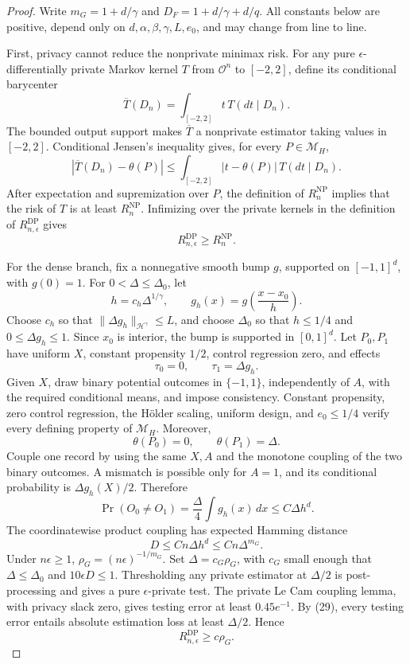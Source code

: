 \documentclass{article}
\begin{document}
\begin{proof}
Write \(m_G=1+d/\gamma\) and \(D_F=1+d/\gamma+d/q\).  All constants below are positive, depend only on \(d,\alpha,\beta,\gamma,L,e_0\), and may change from line to line.

First, privacy cannot reduce the nonprivate minimax risk.  For any pure \(\epsilon\)-differentially private Markov kernel \(T\) from \(\mathcal O^n\) to \([-2,2]\), define its conditional barycenter
\[
 \overline T(D_n)=\int_{[-2,2]}t\,T(dt\mid D_n).
\]
The bounded output support makes \(\overline T\) a nonprivate estimator taking values in \([-2,2]\).  Conditional Jensen's inequality gives, for every \(P\in\mathcal M_H\),
\[
 |\overline T(D_n)-\theta(P)|
 \le\int_{[-2,2]}|t-\theta(P)|\,T(dt\mid D_n).
\]
After expectation and supremization over \(P\), the definition of \(R_n^{\mathrm{NP}}\) implies that the risk of \(T\) is at least \(R_n^{\mathrm{NP}}\).  Infimizing over the private kernels in the definition of \(R_{n,\epsilon}^{\mathrm{DP}}\) gives
\[
 R_{n,\epsilon}^{\mathrm{DP}}\ge R_n^{\mathrm{NP}}.
 \tag{28}
\]

For the dense branch, fix a nonnegative smooth bump \(g\), supported on \([-1,1]^d\), with \(g(0)=1\).  For \(0<\Delta\le\Delta_0\), let
\[
 h=c_h\Delta^{1/\gamma},\qquad
 g_h(x)=g\!\left(\frac{x-x_0}{h}\right).
\]
Choose \(c_h\) so that \(\|\Delta g_h\|_{\mathcal H^\gamma}\le L\), and choose \(\Delta_0\) so that \(h\le1/4\) and \(0\le\Delta g_h\le1\).  Since \(x_0\) is interior, the bump is supported in \([0,1]^d\).  Let \(P_0,P_1\) have uniform \(X\), constant propensity \(1/2\), control regression zero, and effects
\[
 \tau_0=0,\qquad \tau_1=\Delta g_h.
\]
Given \(X\), draw binary potential outcomes in \(\{-1,1\}\), independently of \(A\), with the required conditional means, and impose consistency.  Constant propensity, zero control regression, the H\"older scaling, uniform design, and \(e_0\le1/4\) verify every defining property of \(\mathcal M_H\).  Moreover,
\[
 \theta(P_0)=0,\qquad \theta(P_1)=\Delta.
 \tag{29}
\]
Couple one record by using the same \(X,A\) and the monotone coupling of the two binary outcomes.  A mismatch is possible only for \(A=1\), and its conditional probability is \(\Delta g_h(X)/2\).  Therefore
\[
 \Pr(O_0\ne O_1)
 =\frac{\Delta}{4}\int g_h(x)\,dx
 \le C\Delta h^d.
\]
The coordinatewise product coupling has expected Hamming distance
\[
 D\le Cn\Delta h^d\le Cn\Delta^{m_G}.
 \tag{30}
\]
Under \(n\epsilon\ge1\), \(\rho_G=(n\epsilon)^{-1/m_G}\).  Set \(\Delta=c_G\rho_G\), with \(c_G\) small enough that \(\Delta\le\Delta_0\) and \(10\epsilon D\le1\).  Thresholding any private estimator at \(\Delta/2\) is post-processing and gives a pure \(\epsilon\)-private test.  The private Le Cam coupling lemma, with privacy slack zero, gives testing error at least \(0.45e^{-1}\).  By (29), every testing error entails absolute estimation loss at least \(\Delta/2\).  Hence
\[
 R_{n,\epsilon}^{\mathrm{DP}}\ge c\rho_G.
 \tag{31}
\]


\end{proof}
\end{document}
